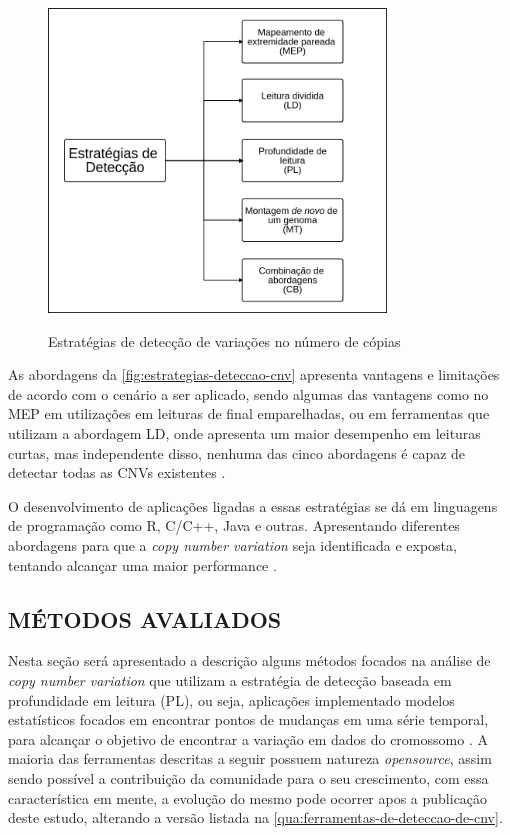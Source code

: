 \begin{figure}[!htb]
    \centering
    \caption{Estratégias de detecção de variações no número de cópias}
    \includegraphics[width=0.8\textwidth]{./dados/figuras/estrategias-deteccao-cnv}
    \label{fig:estrategias-deteccao-cnv}
\end{figure}

As abordagens da \autoref{fig:estrategias-deteccao-cnv} apresenta vantagens e limitações de acordo com o cenário a ser aplicado, sendo algumas das vantagens como no MEP em utilizações em leituras de final emparelhadas, ou em ferramentas que utilizam a abordagem LD, onde apresenta um maior desempenho em leituras curtas, mas independente disso, nenhuma das cinco abordagens é capaz de detectar todas as CNVs existentes \cite{Zhao2013}. 

O desenvolvimento de aplicações ligadas a essas estratégias se dá em linguagens de programação como R, C/C++, Java e outras. Apresentando diferentes abordagens para que a \textit{copy number variation} seja identificada e exposta, tentando alcançar uma maior performance \cite{Zhao2013}. 

\subsection{MÉTODOS AVALIADOS} 

Nesta seção será apresentado a descrição alguns métodos focados na análise de \textit{copy number variation} que utilizam a estratégia de detecção baseada em profundidade em leitura (PL), ou seja, aplicações implementado modelos estatísticos focados em encontrar pontos de mudanças em uma série temporal, para alcançar o objetivo de encontrar a variação em dados do cromossomo \cite{Zhao2013}. A maioria das ferramentas descritas a seguir possuem natureza \textit{opensource}, assim sendo possível a contribuição da comunidade para o seu crescimento, com essa característica em mente, a evolução do mesmo pode ocorrer apos a publicação deste estudo, alterando a versão listada na \autoref{qua:ferramentas-de-deteccao-de-cnv}.


